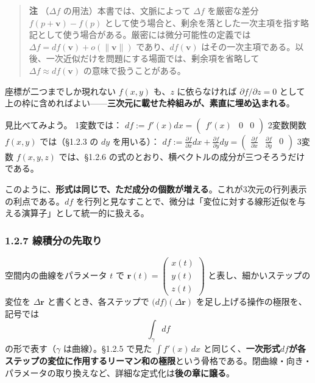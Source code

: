 \documentclass[a4paper,12pt,openany]{book}
\begin{document}
\begin{quote}
\textbf{注} （\(\Delta f\) の用法）本書では、文脈によって \(\Delta f\)
を厳密な差分 \(f(p+\mathbf{v})-f(p)\)
として使う場合と、剰余を落とした一次主項を指す略記として使う場合がある。厳密には微分可能性の定義では
\(\Delta f = df(\mathbf{v}) + o(\|\mathbf{v}\|)\)
であり、\(df(\mathbf{v})\)
はその一次主項である。以後、一次近似だけを問題にする場面では、剰余項を省略して
\(\Delta f \approx df(\mathbf{v})\) の意味で扱うことがある。
\end{quote}

座標が二つまでしか現れない \(f(x,y)\) も、\(z\) に依らなければ
\(\partial f/\partial z=0\)
として上の枠に含めればよい——\textbf{三次元に載せた枠組みが、素直に埋め込まれる}。

見比べてみよう。 1変数では：
\(df := f'(x) dx = \begin{pmatrix} f'(x) & 0 & 0 \end{pmatrix}\)
2変数関数 \(f(x, y)\) では（§1.2.3 の \(dy\) を用いる）：
\(df := \frac{\partial f}{\partial x} dx + \frac{\partial f}{\partial y} dy = \begin{pmatrix} \frac{\partial f}{\partial x} & \frac{\partial f}{\partial y} & 0 \end{pmatrix}\)
3変数 \(f(x,y,z)\) では、§1.2.6
の式のとおり、横ベクトルの成分が三つそろうだけである。

このように、\textbf{形式は同じで、ただ成分の個数が増える}。これが\(3\)次元の行列表示の利点である。\(df\)
を行列と見なすことで、微分は「変位に対する線形近似を与える演算子」として統一的に扱える。

\hypertarget{ux7ddaux7a4dux5206ux306eux5148ux53d6ux308a}{%
\subsubsection{1.2.7
線積分の先取り}\label{ux7ddaux7a4dux5206ux306eux5148ux53d6ux308a}}

空間内の曲線をパラメータ \(t\) で
\(\mathbf{r}(t)=\begin{pmatrix}x(t)\\y(t)\\z(t)\end{pmatrix}\)
と表し、細かいステップの変位を \(\Delta\mathbf{r}\)
と書くとき、各ステップで \(\bigl(df\bigr)(\Delta\mathbf{r})\)
を足し上げる操作の極限を、記号では \[\int_\gamma df\]
の形で表す（\(\gamma\) は曲線）。§1.2.5 で見た \(\int f'(x)\,dx\)
と同じく、\textbf{一次形式}\(df\)\textbf{が各ステップの変位に作用するリーマン和の極限}という骨格である。閉曲線・向き・パラメータの取り換えなど、詳細な定式化は\textbf{後の章に譲る}。
\end{document}
